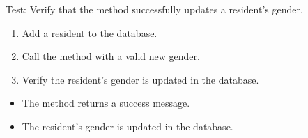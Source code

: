 \documentclass[letterpaper,10pt,english]{sphinxmanual}
\begin{document}
\begin{fulllineitems}
\label{\detokenize{test:test.test_residetnt.test_update_resident_gender_success}}
\pysigstartsignatures
\pysiglinewithargsret
{}
{}
{}
\pysigstopsignatures
\sphinxAtStartPar
Test: Verify that the method successfully updates a resident’s gender.
\begin{description}
\begin{enumerate}
%
\item {} 
\sphinxAtStartPar
Add a resident to the database.

\item {} 
\sphinxAtStartPar
Call the  method with a valid new gender.

\item {} 
\sphinxAtStartPar
Verify the resident’s gender is updated in the database.

\end{enumerate}

\begin{itemize}
\item {} 
\sphinxAtStartPar
The method returns a success message.

\item {} 
\sphinxAtStartPar
The resident’s gender is updated in the database.

\end{itemize}

\end{description}

\end{fulllineitems}

\end{document}
